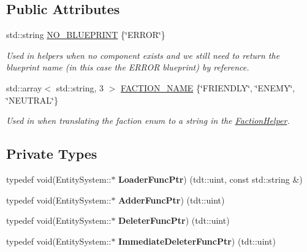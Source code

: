 \subsection*{Public Attributes}
\begin{DoxyCompactItemize}
\item 
std\+::string \hyperlink{class_entity_system_a41e0561691509c232c26dc78c819c74e}{N\+O\+\_\+\+B\+L\+U\+E\+P\+R\+I\+NT} \{\char`\"{}E\+R\+R\+OR\char`\"{}\}
\begin{DoxyCompactList}\small\item\em Used in helpers when no component exists and we still need to return the blueprint name (in this case the E\+R\+R\+OR blueprint) by reference. \end{DoxyCompactList}\item 
std\+::array$<$ std\+::string, 3 $>$ \hyperlink{class_entity_system_a64eff1a78f8685a3b8319b5219381963}{F\+A\+C\+T\+I\+O\+N\+\_\+\+N\+A\+ME} \{\char`\"{}F\+R\+I\+E\+N\+D\+LY\char`\"{}, \char`\"{}E\+N\+E\+MY\char`\"{}, \char`\"{}N\+E\+U\+T\+R\+AL\char`\"{}\}
\begin{DoxyCompactList}\small\item\em Used in when translating the faction enum to a string in the \hyperlink{namespace_faction_helper}{Faction\+Helper}. \end{DoxyCompactList}\end{DoxyCompactItemize}
\subsection*{Private Types}
\begin{DoxyCompactItemize}
\item 
typedef void(Entity\+System\+::$\ast$ {\bfseries Loader\+Func\+Ptr}) (tdt\+::uint, const std\+::string \&)\hypertarget{class_entity_system_ab03b379651ef1bf67979d7b7fc92159f}{}\label{class_entity_system_ab03b379651ef1bf67979d7b7fc92159f}

\item 
typedef void(Entity\+System\+::$\ast$ {\bfseries Adder\+Func\+Ptr}) (tdt\+::uint)\hypertarget{class_entity_system_a79cd6b4f2069db9cb8385aa10ac5e3f3}{}\label{class_entity_system_a79cd6b4f2069db9cb8385aa10ac5e3f3}

\item 
typedef void(Entity\+System\+::$\ast$ {\bfseries Deleter\+Func\+Ptr}) (tdt\+::uint)\hypertarget{class_entity_system_aa157465c64a590da2c678dde38993d97}{}\label{class_entity_system_aa157465c64a590da2c678dde38993d97}

\item 
typedef void(Entity\+System\+::$\ast$ {\bfseries Immediate\+Deleter\+Func\+Ptr}) (tdt\+::uint)\hypertarget{class_entity_system_af8220281ae12f27126e4203d922a2931}{}\label{class_entity_system_af8220281ae12f27126e4203d922a2931}

\end{DoxyCompactItemize}
